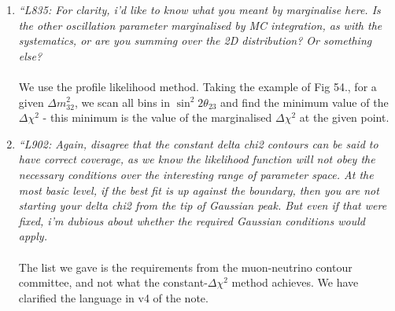 \begin{enumerate}
{It would be nice to have the 0-1 region take up more of the ratio plots. Since they are ratios,  a log axis might work?
}\\
\\
We feel that the plots are ok. Figs. 39-44 show the result with the
fit binning (73 bins) and so suffer from problems with a high
statistical error - this makes it both hard to plot \& hard to make
conclusions.
That is the purpose of Figs. 45 \& 47 (with 20 coarse bins). We will update these 2 plots
with a taller bottom TPad in v5 of the note.

 
\vspace{5 mm}
\item
{\em
	``L835:
For clarity, i'd like to know what you meant by marginalise here.  Is the other oscillation parameter marginalised by MC integration, as with the systematics, or are you summing over the 2D distribution?
Or something else?
}\\
\\
We use the profile likelihood method. Taking the example of Fig 54.,
for a given $\Delta m^2_{32}$, we scan all bins in $\sin^2 2\theta_{23}$ and find the minimum value of the $\Delta \chi^2$ - this minimum is the value of the 
marginalised $\Delta \chi^2$ at the given point.


\vspace{5 mm}
\item
{\em
	``L902:
Again, disagree that the constant delta chi2 contours can be said to have correct coverage, as we know the likelihood function will not obey the necessary conditions over the interesting range of parameter space. 
At the most basic level, if the best fit is up against the boundary, then you are not starting your delta chi2 from the tip of Gaussian peak.  But even if that were fixed, i'm dubious about whether the required Gaussian conditions would apply.
}\\
\\
The list we gave is the requirements from the muon-neutrino contour
committee, and not what the constant-$\Delta \chi^2$ method achieves.
We have clarified the language in v4 of the note.



\end{enumerate}
